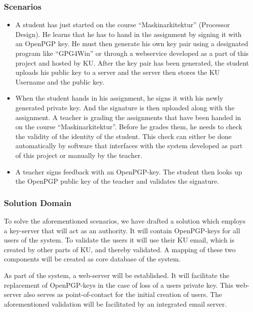 \documentclass[11pt,a4paper]{report}
\begin{document}
\subsubsection{Scenarios}\label{Scenarios}
\begin{itemize}
\item A student has just started on the course ``Maskinarkitektur'' (Processor Design). He learns that he has to hand in the assignment by signing it with an OpenPGP key. He must then generate his own key pair using a designated program like ``GPG4Win'' or through a webservice developed as a part of this project and hosted by KU. After the key pair has been generated, the student uploads his public key to a server and the server then stores the KU Username and the public key.
\item When the student hands in his assignment, he signs it with his newly generated private key. And the signature is then uploaded along with the assignment. A teacher is grading the assignments that have been handed in on the course ``Maskinarkitektur''. Before he grades them, he needs to check the validity of the identity of the student. This check can either be done automatically by software that interfaces with the system developed as part of this project or manually by the teacher.
\item A teacher signs feedback with an OpenPGP-key. The student then looks up the OpenPGP public key of the teacher and validates the signature.
\end{itemize}

\subsubsection{Solution Domain}\label{Solution_Domain}

To solve the aforementioned scenarios, we have drafted a solution which employs a key-server that will act as an authority. It will contain OpenPGP-keys for all users of the system. To validate the users it will use their KU email, which is created by other parts of KU, and thereby validated. A mapping of these two components will be created as core database of the system.

As part of the system, a web-server will be established. It will facilitate the replacement of OpenPGP-keys in the case of loss of a users private key. This web-server also serves as point-of-contact for the initial creation of users. The aforementioned validation will be facilitated by an integrated email server.
\end{document}
